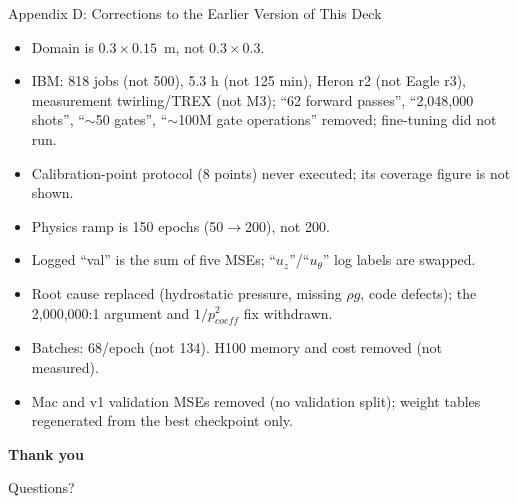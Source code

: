 \documentclass[aspectratio=169]{beamer}
\begin{document}
\begin{frame}{Appendix D: Corrections to the Earlier Version of This Deck}
\scriptsize
\begin{itemize}
  \item Domain is $0.3\times0.15$~m, not $0.3\times0.3$.
  \item IBM: 818 jobs (not 500), 5.3 h (not 125 min), Heron r2 (not Eagle r3), measurement twirling/TREX (not M3); ``62 forward passes'', ``2,048,000 shots'', ``$\sim$50 gates'', ``$\sim$100M gate operations'' removed; fine-tuning did not run.
  \item Calibration-point protocol (8 points) never executed; its coverage figure is not shown.
  \item Physics ramp is 150 epochs (50$\to$200), not 200.
  \item Logged ``val'' is the sum of five MSEs; ``$u_z$''/``$u_\theta$'' log labels are swapped.
  \item Root cause replaced (hydrostatic pressure, missing $\rho g$, code defects); the 2,000,000:1 argument and $1/p_{coeff}^2$ fix withdrawn.
  \item Batches: 68/epoch (not 134). H100 memory and cost removed (not measured).
  \item Mac and v1 validation MSEs removed (no validation split); weight tables regenerated from the best checkpoint only.
\end{itemize}
\end{frame}

\begin{frame}
\centering
\Large \textbf{Thank you}

\vspace{0.5cm}
\normalsize
Questions?
\end{frame}
\end{document}
